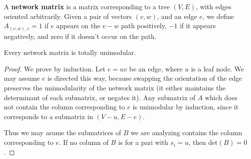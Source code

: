 A {\bf network matrix} is a matrix corresponding to a tree $(V,E)$, with edges oriented arbitrarily. Given a pair of vectors $(v,w)$, and an edge $e$, we define $A_{(v,w),e} = 1$ if $e$ appears on the $v-w$ path positively, $-1$ if it appears negatively, and zero if it doesn't occur on the path.

\begin{theorem}
    Every network matrix is totally unimodular.
\end{theorem}
\begin{proof}
    We prove by induction. Let $e = uv$ be an edge, where $u$ is a leaf node. We may assume $e$ is directed this way, because swapping the orientation of the edge preserves the unimodularity of the network matrix (it either maintains the determinant of each submatrix, or negates it). Any submatrix of $A$ which does not contain the column corresponding to $e$ is unimodular by induction, since it corresponds to a submatrix in $(V-u, E-e)$.

    Thus we may asume the submatrices of $B$ we are analyzing contains the column corresponding to $e$. If no column of $B$ is for a pari with $s_i = u$, then $\text{det}(B) = 0$.
\end{proof}

